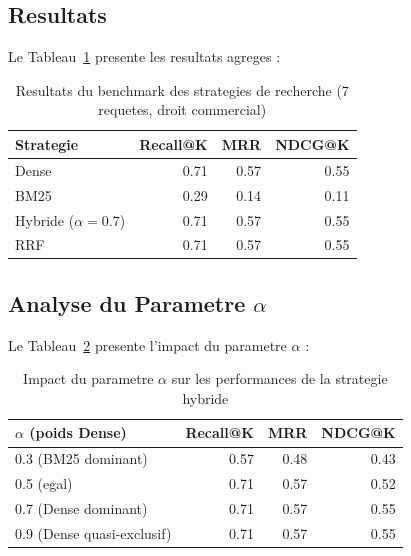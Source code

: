 \subsection{Resultats}

Le Tableau~\ref{tab:retrieval-results} presente les resultats agreges :

\begin{table}[h]
\centering
\renewcommand{\arraystretch}{1.3}
\begin{tabular}{|l|r|r|r|}
\hline
\rowcolor{LightBlue}
\textbf{\color{PrimaryBlue}Strategie} & \textbf{\color{PrimaryBlue}Recall@K} & \textbf{\color{PrimaryBlue}MRR} & \textbf{\color{PrimaryBlue}NDCG@K} \\
\hline
Dense & 0.71 & 0.57 & 0.55 \\
BM25 & 0.29 & 0.14 & 0.11 \\
Hybride ($\alpha = 0.7$) & 0.71 & 0.57 & 0.55 \\
RRF & 0.71 & 0.57 & 0.55 \\
\hline
\end{tabular}
\caption{Resultats du benchmark des strategies de recherche (7 requetes, droit commercial)}
\label{tab:retrieval-results}
\end{table}

\subsection{Analyse du Parametre $\alpha$}

Le Tableau~\ref{tab:alpha-tuning} presente l'impact du parametre $\alpha$ :

\begin{table}[h]
\centering
\renewcommand{\arraystretch}{1.3}
\begin{tabular}{|l|r|r|r|}
\hline
\rowcolor{LightBlue}
\textbf{\color{PrimaryBlue}$\alpha$ (poids Dense)} & \textbf{\color{PrimaryBlue}Recall@K} & \textbf{\color{PrimaryBlue}MRR} & \textbf{\color{PrimaryBlue}NDCG@K} \\
\hline
0.3 (BM25 dominant) & 0.57 & 0.48 & 0.43 \\
0.5 (egal) & 0.71 & 0.57 & 0.52 \\
0.7 (Dense dominant) & 0.71 & 0.57 & 0.55 \\
0.9 (Dense quasi-exclusif) & 0.71 & 0.57 & 0.55 \\
\hline
\end{tabular}
\caption{Impact du parametre $\alpha$ sur les performances de la strategie hybride}
\label{tab:alpha-tuning}
\end{table}

